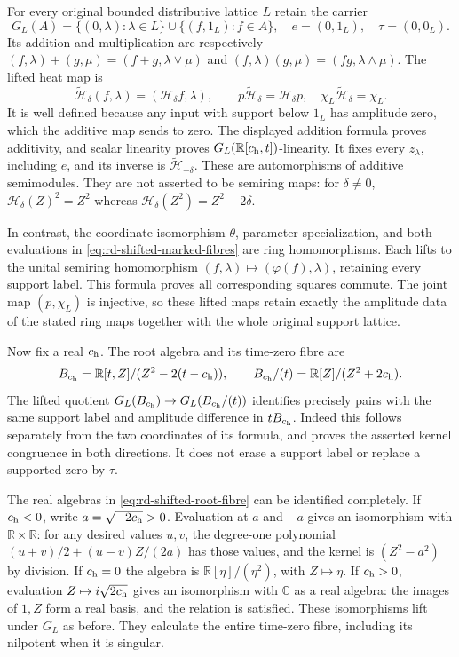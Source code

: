 \documentclass[11pt,a4paper]{article}
\theoremstyle{definition}\newtheorem{definition}[theorem]{Definition}
\begin{document}
For every original bounded distributive lattice $L$ retain the carrier
\[
 G_L(A)=\{(0,\lambda):\lambda\in L\}
          \cup\{(f,1_L):f\in A\},\quad
 e=(0,1_L),\quad\tau=(0,0_L).
\]
Its addition and multiplication are respectively
$(f,\lambda)+(g,\mu)=(f+g,\lambda\vee\mu)$ and
$(f,\lambda)(g,\mu)=(fg,\lambda\wedge\mu)$.
The lifted heat map is
\begin{equation}
 \widetilde{\mathscr H}_\delta(f,\lambda)
       =(\mathscr H_\delta f,\lambda),\qquad
 p\widetilde{\mathscr H}_\delta=\mathscr H_\delta p,
 \quad\chi_L\widetilde{\mathscr H}_\delta=\chi_L.
 \label{eq:rd-shifted-split-heat}
\end{equation}
It is well defined because any input with support below $1_L$ has
amplitude zero, which the additive map sends to zero. The displayed
addition formula proves additivity, and scalar linearity proves
$G_L(\mathbb R[c_{\rm h},t])$-linearity. It fixes every $z_\lambda$,
including $e$, and its inverse is
$\widetilde{\mathscr H}_{-\delta}$. These are automorphisms of
additive semimodules. They are not asserted to be semiring maps:
for $\delta\ne0$, $\mathscr H_\delta(Z)^2=Z^2$ whereas
$\mathscr H_\delta(Z^2)=Z^2-2\delta$.

In contrast, the coordinate isomorphism $\theta$, parameter
specialization, and both evaluations in
\eqref{eq:rd-shifted-marked-fibres} are ring homomorphisms. Each
lifts to the unital semiring homomorphism
$(f,\lambda)\mapsto(\varphi(f),\lambda)$, retaining every support
label. This formula proves all corresponding squares commute.
The joint map $(p,\chi_L)$ is injective, so these lifted maps retain
exactly the amplitude data of the stated ring maps together with the
whole original support lattice.

Now fix a real $c_{\rm h}$. The root algebra and its time-zero fibre
are
\begin{equation}
 B_{c_{\rm h}}=\mathbb R[t,Z]/(Z^2-2(t-c_{\rm h})),\qquad
 B_{c_{\rm h}}/(t)
   =\mathbb R[Z]/(Z^2+2c_{\rm h}).
 \label{eq:rd-shifted-root-fibre}
\end{equation}
The lifted quotient $G_L(B_{c_{\rm h}})\to
G_L(B_{c_{\rm h}}/(t))$ identifies precisely pairs with the same
support label and amplitude difference in $tB_{c_{\rm h}}$.
Indeed this follows separately from the two coordinates of its
formula, and proves the asserted kernel congruence in both
directions. It does not erase a support label or replace a supported
zero by $\tau$.

The real algebras in \eqref{eq:rd-shifted-root-fibre} can be
identified completely. If $c_{\rm h}<0$, write
$a=\sqrt{-2c_{\rm h}}>0$. Evaluation at $a$ and $-a$ gives an
isomorphism with $\mathbb R\times\mathbb R$: for any desired
values $u,v$, the degree-one polynomial
$(u+v)/2+(u-v)Z/(2a)$ has those values, and the kernel is
$(Z^2-a^2)$ by division. If $c_{\rm h}=0$ the algebra is
$\mathbb R[\eta]/(\eta^2)$, with $Z\mapsto\eta$. If
$c_{\rm h}>0$, evaluation $Z\mapsto i\sqrt{2c_{\rm h}}$ gives
an isomorphism with $\mathbb C$ as a real algebra: the images of
$1,Z$ form a real basis, and the relation is satisfied. These
isomorphisms lift under $G_L$ as before. They calculate the entire
time-zero fibre, including its nilpotent when it is singular.
\end{document}
